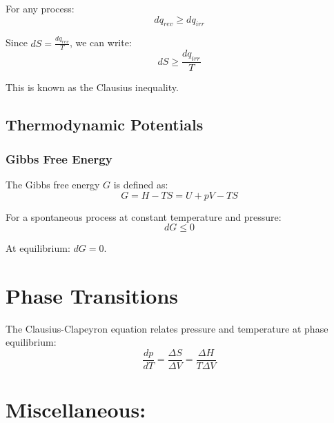 \documentclass{article}
\theoremstyle{definition}
\begin{document}
For any process:
\begin{equation}
dq_{rev} \geq dq_{irr}
\end{equation}

Since $dS = \frac{dq_{rev}}{T}$, we can write:
\begin{equation}
dS \geq \frac{dq_{irr}}{T}
\end{equation}

This is known as the Clausius inequality.

\subsection{Thermodynamic Potentials}

\subsubsection{Gibbs Free Energy}

The Gibbs free energy $G$ is defined as:
\begin{equation}
G = H - TS = U + pV - TS
\end{equation}

For a spontaneous process at constant temperature and pressure:
\begin{equation}
dG \leq 0
\end{equation}

At equilibrium: $dG = 0$.

\section{Phase Transitions}

The Clausius-Clapeyron equation relates pressure and temperature at phase equilibrium:
\begin{equation}
\frac{dp}{dT} = \frac{\Delta S}{\Delta V} = \frac{\Delta H}{T \Delta V}
\end{equation}

\section{Miscellaneous:}
\end{document}
